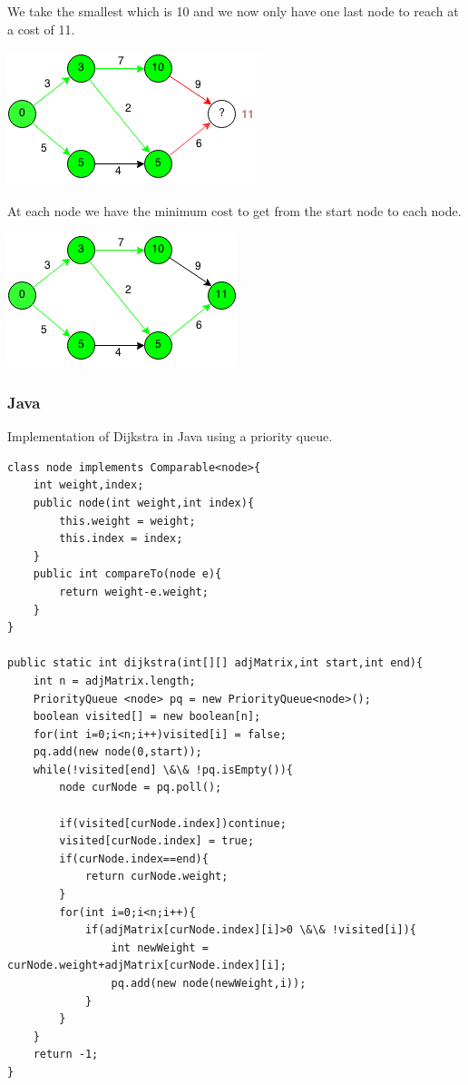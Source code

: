 \documentclass[11pt,oneside]{book}
\makeatletter
\def\maxwidth#1{\ifdim\Gin@nat@width>#1 #1\else\Gin@nat@width\fi}
\makeatother
\begin{document}
We take the smallest which is 10 and we now only have one last node to reach at a cost of 11.

\vspace{5px}\includegraphics[width=\maxwidth{\textwidth}]{djikstra5.png}

At each node we have the minimum cost to get from the start node to each node.

\vspace{5px}\includegraphics[width=\maxwidth{\textwidth}]{djikstra6.png}

\subsubsection{Java}

Implementation of Dijkstra in Java using a priority queue.

\begin{lstlisting}
class node implements Comparable<node>{
    int weight,index;
    public node(int weight,int index){
        this.weight = weight;
        this.index = index;
    }
    public int compareTo(node e){
        return weight-e.weight;
    }
}

public static int dijkstra(int[][] adjMatrix,int start,int end){
    int n = adjMatrix.length;
    PriorityQueue <node> pq = new PriorityQueue<node>();
    boolean visited[] = new boolean[n];
    for(int i=0;i<n;i++)visited[i] = false;
    pq.add(new node(0,start));
    while(!visited[end] \&\& !pq.isEmpty()){
        node curNode = pq.poll();
    
        if(visited[curNode.index])continue;
        visited[curNode.index] = true;
        if(curNode.index==end){
            return curNode.weight;
        }
        for(int i=0;i<n;i++){
            if(adjMatrix[curNode.index][i]>0 \&\& !visited[i]){
                int newWeight = curNode.weight+adjMatrix[curNode.index][i];
                pq.add(new node(newWeight,i));
            }
        }
    }
    return -1;
}
\end{lstlisting}
\end{document}
